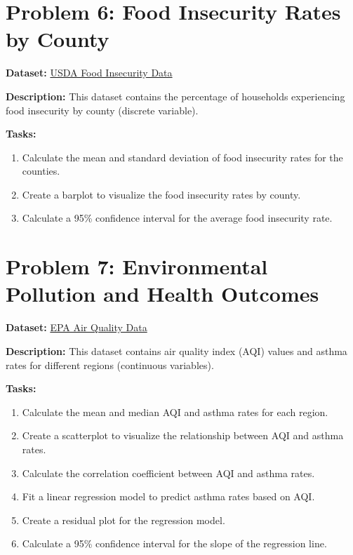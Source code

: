 \documentclass[
  letterpaper,
  DIV=11,
  numbers=noendperiod]{scrreprt}
\providecommand{\tightlist}{%
  \setlength{\itemsep}{0pt}\setlength{\parskip}{0pt}}\usepackage{longtable,booktabs,array}
\begin{document}
\section*{Problem 6: Food Insecurity Rates by
County}\label{problem-6-food-insecurity-rates-by-county}


\textbf{Dataset:}
\href{https://www.ers.usda.gov/data-products/food-access-research-atlas/}{USDA
Food Insecurity Data}

\textbf{Description:} This dataset contains the percentage of households
experiencing food insecurity by county (discrete variable).

\textbf{Tasks:}

\begin{enumerate}
\def\labelenumi{\arabic{enumi}.}
\tightlist
\item
  Calculate the mean and standard deviation of food insecurity rates for
  the counties.
\item
  Create a barplot to visualize the food insecurity rates by county.
\item
  Calculate a 95\% confidence interval for the average food insecurity
  rate.
\end{enumerate}

\section*{Problem 7: Environmental Pollution and Health
Outcomes}\label{problem-7-environmental-pollution-and-health-outcomes}


\textbf{Dataset:}
\href{https://www.epa.gov/outdoor-air-quality-data}{EPA Air Quality
Data}

\textbf{Description:} This dataset contains air quality index (AQI)
values and asthma rates for different regions (continuous variables).

\textbf{Tasks:}

\begin{enumerate}
\def\labelenumi{\arabic{enumi}.}
\tightlist
\item
  Calculate the mean and median AQI and asthma rates for each region.
\item
  Create a scatterplot to visualize the relationship between AQI and
  asthma rates.
\item
  Calculate the correlation coefficient between AQI and asthma rates.
\item
  Fit a linear regression model to predict asthma rates based on AQI.
\item
  Create a residual plot for the regression model.
\item
  Calculate a 95\% confidence interval for the slope of the regression
  line.
\end{enumerate}
\end{document}

